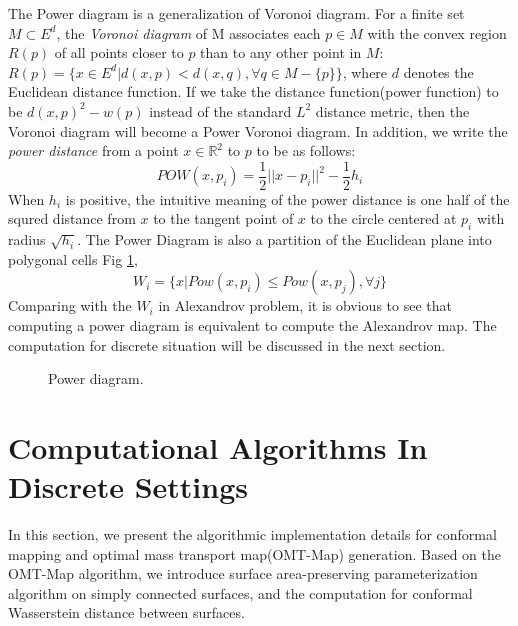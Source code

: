 \documentclass[runningheads]{llncs}
\begin{document}
The Power diagram is a generalization of Voronoi diagram. For a finite set $M\subset E^d$, the \textit{Voronoi diagram} of M associates each $p\in M$ with the convex region $R(p)$ of all points closer to $p$ than to any other point in $M$: $R(p)=\{x\in E^d | d(x,p)<d(x,q), \forall q \in M-\{p\}\}$, where $d$ denotes the Euclidean distance function. If we take the distance function(power function) to be $d(x,p)^2-w(p)$ instead of the standard $L^2$ distance metric, then the Voronoi diagram will become a Power Voronoi diagram. In addition, we write the \textit{power distance} from a point $x\in\mathbb{R}^2$ to $p$ to be as follows: $$POW(x,p_i)=\dfrac{1}{2}||x-p_i||^2-\dfrac{1}{2}h_i$$
When $h_i$ is positive, the intuitive meaning of the power distance is one half of the squred distance from $x$ to the tangent point of $x$ to the circle centered at $p_i$ with radius $\sqrt{h_i}$. The Power Diagram is also a partition of the Euclidean plane into polygonal cells Fig \ref{fig:PowDia}, $$W_i=\{x|Pow(x,p_i)\leq Pow(x,p_j), \forall j\}$$
Comparing with the $W_i$ in Alexandrov problem, it is obvious to see that computing a power diagram is equivalent to compute the Alexandrov map. The computation for discrete situation will be discussed in the next section.

\begin{figure}
\centering
{}
\caption{Power diagram.}
\label{fig:PowDia}
\end{figure}

\section{Computational Algorithms In Discrete Settings}

In this section, we present the algorithmic implementation details for conformal mapping and optimal mass transport map(OMT-Map) generation. Based on the OMT-Map algorithm, we introduce surface area-preserving parameterization algorithm on simply connected surfaces, and the computation for conformal Wasserstein distance between surfaces.
\end{document}
